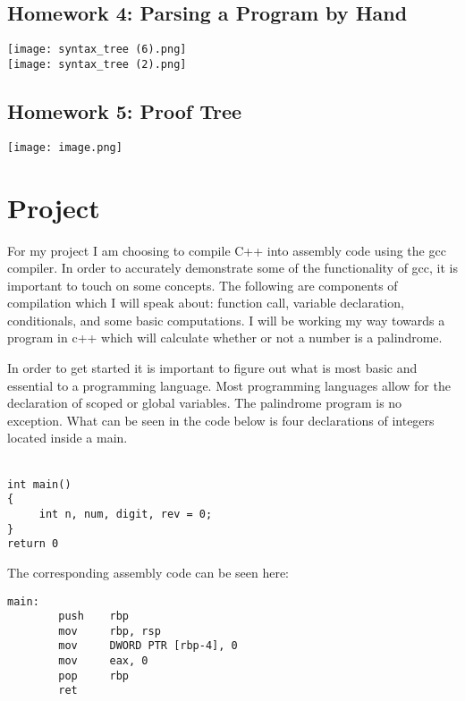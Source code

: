\documentclass{article}
\theoremstyle{theorem}
\theoremstyle{definition}
\theoremstyle{remark}
\begin{document}
\subsection{Homework 4: Parsing a Program by Hand}
\texttt{[image: syntax\_tree (6).png]}\\
\texttt{[image: syntax\_tree (2).png]}

\subsection{Homework 5: Proof Tree}


\texttt{[image: image.png]}




\section{Project}

For my project I am choosing to compile C++ into assembly code using the gcc compiler. In order to accurately demonstrate some of the functionality of gcc, it is important to touch on some concepts. The following are components of compilation which I will speak about: function call, variable declaration, conditionals, and some basic computations. I will be working my way towards a program in c++ which will calculate whether or not a number is a palindrome.

In order to get started it is important to figure out what is most basic and essential to a programming language. Most programming languages allow for the declaration of scoped or global variables. The palindrome program is no exception. What can be seen in the code below is four declarations of integers located inside a main.\\\\

\begin{lstlisting}
int main()
{
     int n, num, digit, rev = 0;
}
return 0
\end{lstlisting}

The corresponding assembly code can be seen here:
\begin{lstlisting}
main:
        push    rbp
        mov     rbp, rsp
        mov     DWORD PTR [rbp-4], 0
        mov     eax, 0
        pop     rbp
        ret
\end{lstlisting}
\end{document}
